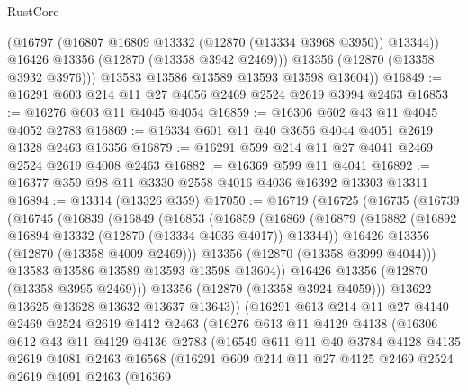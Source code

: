 \begin{lexlean}{RustCore}
\begin{coremodule}
            (@16797 (@16807 @16809 @13332 (@12870 (@13334 @3968 @3950)) @13344))
            @16426
            @13356
            (@12870 (@13358 @3942 @2469)))
          @13356
          (@12870 (@13358 @3932 @3976)))
        @13583
        @13586
        @13589
        @13593
        @13598
        @13604))
@16849 := @16291 @603 @214 @11 @27 @4056 @2469 @2524 @2619 @3994 @2463
@16853 := @16276 @603 @11 @4045 @4054
@16859 := @16306 @602 @43 @11 @4045 @4052 @2783
@16869 := @16334 @601 @11 @40 @3656 @4044 @4051 @2619 @1328 @2463 @16356
@16879 := @16291 @599 @214 @11 @27 @4041 @2469 @2524 @2619 @4008 @2463
@16882 := @16369 @599 @11 @4041
@16892 := @16377 @359 @98 @11 @3330 @2558 @4016 @4036 @16392 @13303 @13311
@16894 := @13314 (@13326 @359)
@17050 := @16719
    (@16725
      (@16735
        (@16739
          (@16745
            (@16839
              (@16849
                (@16853
                  (@16859
                    (@16869
                      (@16879
                        (@16882 (@16892 @16894 @13332 (@12870 (@13334 @4036 @4017)) @13344))
                        @16426
                        @13356
                        (@12870 (@13358 @4009 @2469)))
                      @13356
                      (@12870 (@13358 @3999 @4044)))
                    @13583
                    @13586
                    @13589
                    @13593
                    @13598
                    @13604))
                @16426
                @13356
                (@12870 (@13358 @3995 @2469)))
              @13356
              (@12870 (@13358 @3924 @4059)))
            @13622
            @13625
            @13628
            @13632
            @13637
            @13643))
        (@16291
          @613
          @214
          @11
          @27
          @4140
          @2469
          @2524
          @2619
          @1412
          @2463
          (@16276
            @613
            @11
            @4129
            @4138
            (@16306
              @612
              @43
              @11
              @4129
              @4136
              @2783
              (@16549
                @611
                @11
                @40
                @3784
                @4128
                @4135
                @2619
                @4081
                @2463
                @16568
                (@16291
                  @609
                  @214
                  @11
                  @27
                  @4125
                  @2469
                  @2524
                  @2619
                  @4091
                  @2463
                  (@16369

\end{coremodule}
\end{lexlean}
